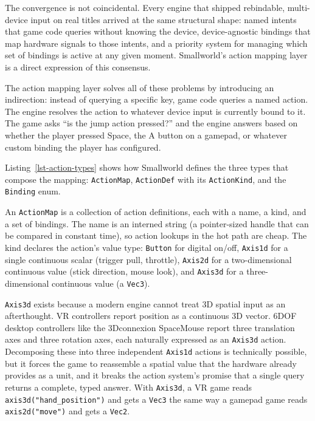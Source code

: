 \documentclass[
  11pt,
  letterpaper,
  DIV=11,
  numbers=noendperiod,
  twoside,
  open=right]{scrreprt}
\begin{document}
The convergence is not coincidental. Every engine that shipped
rebindable, multi-device input on real titles arrived at the same
structural shape: named intents that game code queries without knowing
the device, device-agnostic bindings that map hardware signals to those
intents, and a priority system for managing which set of bindings is
active at any given moment. Smallworld's action mapping layer is a
direct expression of this consensus.

The action mapping layer solves all of these problems by introducing an
indirection: instead of querying a specific key, game code queries a
named action. The engine resolves the action to whatever device input is
currently bound to it. The game asks ``is the jump action pressed?'' and
the engine answers based on whether the player pressed Space, the A
button on a gamepad, or whatever custom binding the player has
configured.

Listing~\ref{lst-action-types} shows how Smallworld defines the three
types that compose the mapping: \texttt{ActionMap}, \texttt{ActionDef}
with its \texttt{ActionKind}, and the \texttt{Binding} enum.

An \texttt{ActionMap} is a collection of action definitions, each with a
name, a kind, and a set of bindings. The name is an interned string (a
pointer-sized handle that can be compared in constant time), so action
lookups in the hot path are cheap. The kind declares the action's value
type: \texttt{Button} for digital on/off, \texttt{Axis1d} for a single
continuous scalar (trigger pull, throttle), \texttt{Axis2d} for a
two-dimensional continuous value (stick direction, mouse look), and
\texttt{Axis3d} for a three-dimensional continuous value (a
\texttt{Vec3}).

\texttt{Axis3d} exists because a modern engine cannot treat 3D spatial
input as an afterthought. VR controllers report position as a continuous
3D vector. 6DOF desktop controllers like the 3Dconnexion SpaceMouse
report three translation axes and three rotation axes, each naturally
expressed as an \texttt{Axis3d} action. Decomposing these into three
independent \texttt{Axis1d} actions is technically possible, but it
forces the game to reassemble a spatial value that the hardware already
provides as a unit, and it breaks the action system's promise that a
single query returns a complete, typed answer. With \texttt{Axis3d}, a
VR game reads \texttt{axis3d("hand\_position")} and gets a \texttt{Vec3}
the same way a gamepad game reads \texttt{axis2d("move")} and gets a
\texttt{Vec2}.
\end{document}
